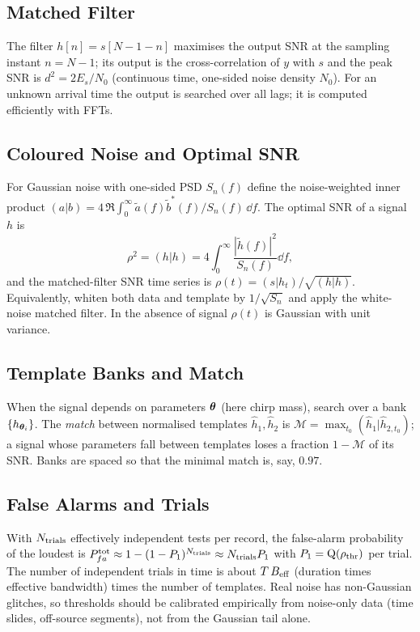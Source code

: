 \documentclass[11pt,a4paper]{article}
\begin{document}
\subsection{Matched Filter}
The filter $h[n]=s[N-1-n]$ maximises the output SNR at the sampling instant $n=N-1$; its output is the cross-correlation of $y$ with $s$ and the peak SNR is $d^2=2E_s/N_0$ (continuous time, one-sided noise density $N_0$). For an unknown arrival time the output is searched over all lags; it is computed efficiently with FFTs.

\subsection{Coloured Noise and Optimal SNR}
For Gaussian noise with one-sided PSD $S_n(f)$ define the noise-weighted inner product $(a|b)=4\,\Re\!\int_0^\infty\tilde a(f)\tilde b^\ast(f)/S_n(f)\,\dd f$. The optimal SNR of a signal $h$ is
\begin{equation}
  \rho^2=(h|h)=4\int_0^\infty\frac{|\tilde h(f)|^2}{S_n(f)}\dd f,
  \label{eq:rho}
\end{equation}
and the matched-filter SNR time series is $\rho(t)=(s|h_t)/\sqrt{(h|h)}$. Equivalently, whiten both data and template by $1/\sqrt{S_n}$ and apply the white-noise matched filter. In the absence of signal $\rho(t)$ is Gaussian with unit variance.

\subsection{Template Banks and Match}
When the signal depends on parameters $\bm{\theta}$ (here chirp mass), search over a bank $\{h_{\bm{\theta}_i}\}$. The \emph{match} between normalised templates $\hat h_1,\hat h_2$ is $\mathcal M=\max_{t_0}(\hat h_1|\hat h_{2,t_0})$; a signal whose parameters fall between templates loses a fraction $1-\mathcal M$ of its SNR. Banks are spaced so that the minimal match is, say, $0.97$.

\subsection{False Alarms and Trials}
With $N_{\rm trials}$ effectively independent tests per record, the false-alarm probability of the loudest is $P_{fa}^{\rm tot}\approx1-(1-P_1)^{N_{\rm trials}}\approx N_{\rm trials}P_1$ with $P_1=\operatorname{Q}(\rho_{\rm thr})$ per trial. The number of independent trials in time is about $T\,B_{\rm eff}$ (duration times effective bandwidth) times the number of templates. Real noise has non-Gaussian glitches, so thresholds should be calibrated empirically from noise-only data (time slides, off-source segments), not from the Gaussian tail alone.
\end{document}
